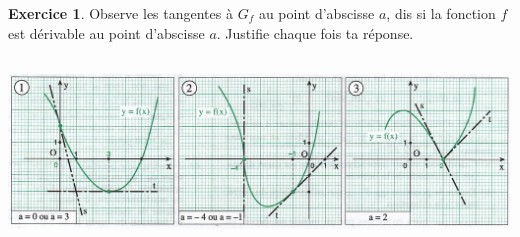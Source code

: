 \documentclass[a4paper,fontsize=13pt]{scrreprt}
\theoremstyle{plain}
\theoremstyle{definition}
\newtheorem{exo}[subsection]{Exercice}
\newtheorem*{solu}{Solution}
\newenvironment{benumerate}[1][0pt]{\begin{enumerate}\renewcommand{\makelabel}[1]{\textbf{##1}}\setlength{\itemsep}{#1}}{\end{enumerate}}
\begin{document}
\begin{exo} Observe les tangentes à $G_f$ au point d'abscisse $a$, dis si la fonction $f$ est dérivable au point d'abscisse $a$. Justifie chaque fois ta réponse.
\begin{center}
\includegraphics[height=5cm]{ex_12.jpg}
\end{center}
\end{exo}

\end{document}
